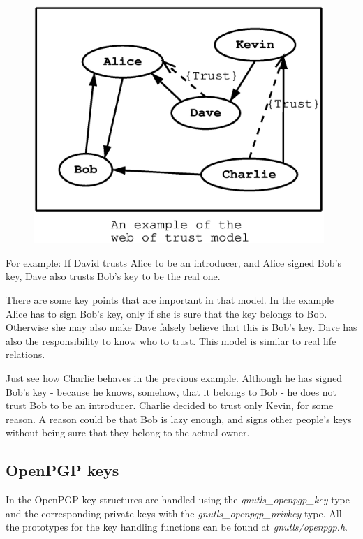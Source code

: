 \begin{figure}[hbtp]
\includegraphics[height=9cm,width=11cm]{pgp-fig1}
\label{fig:pgp1}
\end{figure}

For example: If David trusts Alice to be an introducer, and Alice signed
Bob's key, Dave also trusts Bob's key to be the real one.

There are some key points that are important in that model. In the example
Alice has to sign Bob's key, only if she is sure that the key belongs
to Bob. Otherwise she may also make Dave falsely believe that this
is Bob's key. Dave has also the responsibility to know who to trust.
This model is similar to real life relations.

Just see how Charlie behaves in the previous example. Although he has 
signed Bob's key - because he knows, somehow, that it belongs to Bob - 
he does not trust Bob to be an introducer. Charlie decided to trust only 
Kevin, for some reason. A reason could be that Bob is lazy enough, and 
signs other people's keys without being sure that they belong to the 
actual owner.

\subsection*{OpenPGP keys}
In \gnutls{} the OpenPGP key structures are handled using the
\emph{gnutls\_openpgp\_key} type and the corresponding private keys with
the \emph{gnutls\_openpgp\_privkey} type. All the prototypes for the key handling
functions can be found at \emph{gnutls/openpgp.h}.

